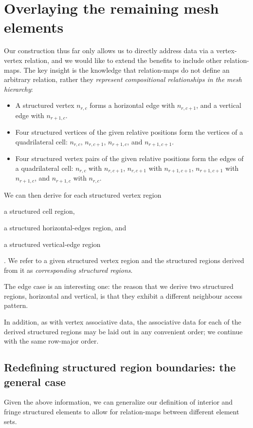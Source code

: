\section{Overlaying the remaining mesh elements}
Our construction thus far only allows us to directly address data via a vertex-vertex relation, and we would like to extend the benefits to include other relation-maps. The key insight is the knowledge that relation-maps do not define an arbitrary relation, rather they \emph{represent compositional relationships in the mesh hierarchy}:
\begin{itemize}
\item A structured vertex $n_{r,c}$ forms a horizontal edge with $n_{r,c+1}$, and a vertical edge with $n_{r+1,c}$.
\item Four structured vertices of the given relative positions form the vertices of a quadrilateral cell: $n_{r,c}$, $n_{r,c+1}$, $n_{r+1,c}$, and $n_{r+1,c+1}$.
\item Four structured vertex pairs of the given relative positions form the edges of a quadrilateral cell: $n_{r,c}$ with $n_{r,c+1}$, $n_{r,c+1}$ with $n_{r+1,c+1}$, $n_{r+1,c+1}$ with $n_{r+1,c}$, and $n_{r+1,c}$ with $n_{r,c}$.
\end{itemize}


We can then derive for each structured vertex region
\begin{enumerate*}[label=\alph*)]
\item a structured cell region,
\item a structured horizontal-edges region, and
\item a structured vertical-edge region
\end{enumerate*}.
We refer to a given structured vertex region and the structured regions derived from it as \emph{corresponding structured regions}.

The edge case is an interesting one: the reason that we derive two structured regions, horizontal and vertical, is that they exhibit a different neighbour access pattern.


In addition, as with vertex associative data, the associative data for each of the derived structured regions may be laid out in any convenient order; we continue with the same row-major order.

\subsection{Redefining structured region boundaries: the general case}
\label{subsec:generalise-boundaries}
Given the above information, we can generalize our definition of interior and fringe structured elements to allow for relation-maps between different element sets.

